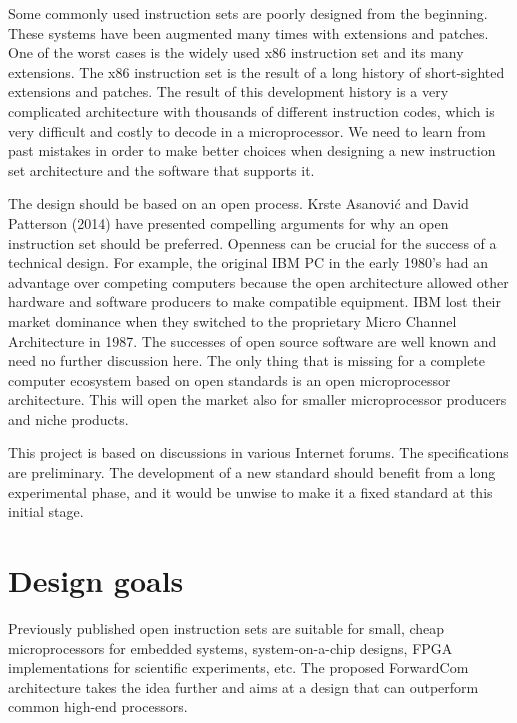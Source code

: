 \documentclass[forwardcom.tex]{subfiles}
\begin{document}
Some commonly used instruction sets are poorly designed from the beginning. These systems have been augmented many times with extensions and patches. One of the worst cases is the widely used x86 instruction set and its many extensions. The x86 instruction set is the result of a long history of short-sighted extensions and patches. The result of this development history is a very complicated architecture with thousands of different instruction codes, which is very difficult and costly to decode in a microprocessor. We need to learn from past mistakes in order to make better choices when designing a new instruction set architecture and the software that supports it.
\vv

The design should be based on an open process. Krste Asanović and David Patterson (2014) have presented compelling arguments for why an open instruction set should be preferred. Openness can be crucial for the success of a technical design. For example, the original IBM PC in the early 1980's had an advantage over competing computers because the open architecture allowed other hardware and software producers to make compatible equipment. IBM lost their market dominance when they switched to the proprietary Micro Channel Architecture in 1987. The successes of open source software are well known and need no further discussion here. The only thing that is missing for a complete computer ecosystem based on open standards is an open microprocessor architecture. This will open the market also for smaller microprocessor producers and niche products.
\vv

This project is based on discussions in various Internet forums. The specifications are preliminary. The development of a new standard should benefit from a long experimental phase, and it would be unwise to make it a fixed standard at this initial stage.


\section{Design goals}
Previously published open instruction sets are suitable for small, cheap microprocessors for embedded systems, system-on-a-chip designs, FPGA implementations for scientific experiments, etc. The proposed ForwardCom architecture takes the idea further and aims at a design that can outperform common high-end processors.
\vv
\end{document}
